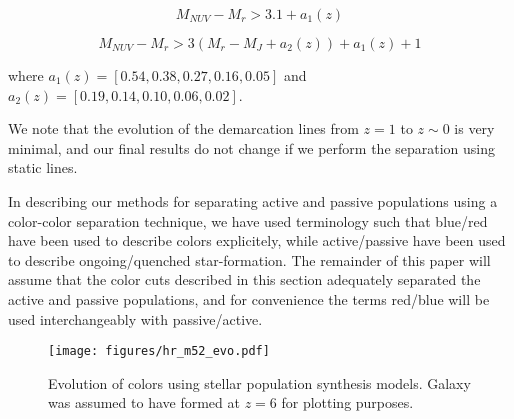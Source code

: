 \begin{equation}
M_{NUV}-M_{r} > 3.1 + a_{1}(z)
\end{equation}

\begin{equation}
M_{NUV}-M_{r} > 3(M_{r}-M_{J} + a_{2}(z))+ a_{1}(z) + 1  
\end{equation}

where $a_{1}(z) = [0.54,0.38,0.27,0.16,0.05]$ and $a_{2}(z) = [0.19,0.14,0.10,0.06,0.02]$. 


We note that the evolution of the demarcation lines from $z=1$ to $z\sim0$ is very minimal, and our final results do not change if we perform the separation using static lines.


In describing our methods for separating active and passive populations using a color-color separation technique, we have used terminology such that blue/red have been used to describe colors explicitely, while active/passive have been used to describe ongoing/quenched star-formation. The remainder of this paper will assume that the color cuts described in this section adequately separated the active and passive populations, and for convenience the terms red/blue will be used interchangeably with passive/active.  

\begin{figure}
\centering
\texttt{[image: figures/hr\_m52\_evo.pdf]} 
\caption{Evolution of colors using stellar population synthesis models. Galaxy was assumed to have formed at $z=6$ for plotting purposes.}
\label{fig:bcmodel}
\end{figure}


